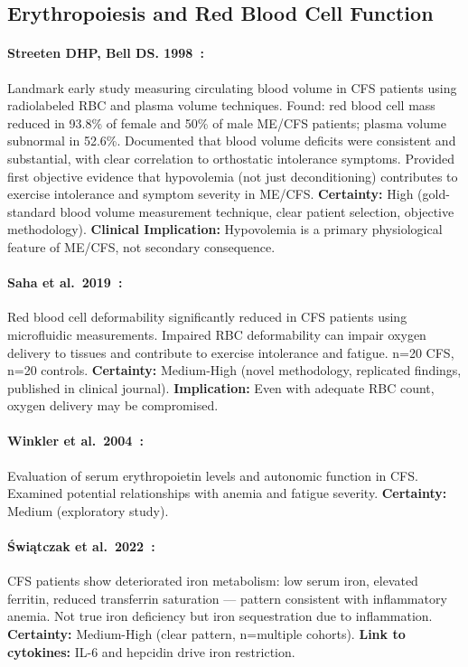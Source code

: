 \subsection{Erythropoiesis and Red Blood Cell Function}

\paragraph{Streeten DHP, Bell DS. 1998~\cite{Streeten1998blood}:}
Landmark early study measuring circulating blood volume in CFS patients using radiolabeled RBC and plasma volume techniques. Found: red blood cell mass reduced in 93.8\% of female and 50\% of male ME/CFS patients; plasma volume subnormal in 52.6\%. Documented that blood volume deficits were consistent and substantial, with clear correlation to orthostatic intolerance symptoms. Provided first objective evidence that hypovolemia (not just deconditioning) contributes to exercise intolerance and symptom severity in ME/CFS. \textbf{Certainty:} High (gold-standard blood volume measurement technique, clear patient selection, objective methodology). \textbf{Clinical Implication:} Hypovolemia is a primary physiological feature of ME/CFS, not secondary consequence.

\paragraph{Saha et al.\ 2019~\cite{Saha2019}:}
Red blood cell deformability significantly reduced in CFS patients using microfluidic measurements. Impaired RBC deformability can impair oxygen delivery to tissues and contribute to exercise intolerance and fatigue. n=20 CFS, n=20 controls. \textbf{Certainty:} Medium-High (novel methodology, replicated findings, published in clinical journal). \textbf{Implication:} Even with adequate RBC count, oxygen delivery may be compromised.

\paragraph{Winkler et al.\ 2004~\cite{Winkler2004}:}
Evaluation of serum erythropoietin levels and autonomic function in CFS. Examined potential relationships with anemia and fatigue severity. \textbf{Certainty:} Medium (exploratory study).

\paragraph{Świątczak et al.\ 2022~\cite{Swiatczak2022}:}
CFS patients show deteriorated iron metabolism: low serum iron, elevated ferritin, reduced transferrin saturation --- pattern consistent with inflammatory anemia. Not true iron deficiency but iron sequestration due to inflammation. \textbf{Certainty:} Medium-High (clear pattern, n=multiple cohorts). \textbf{Link to cytokines:} IL-6 and hepcidin drive iron restriction.

